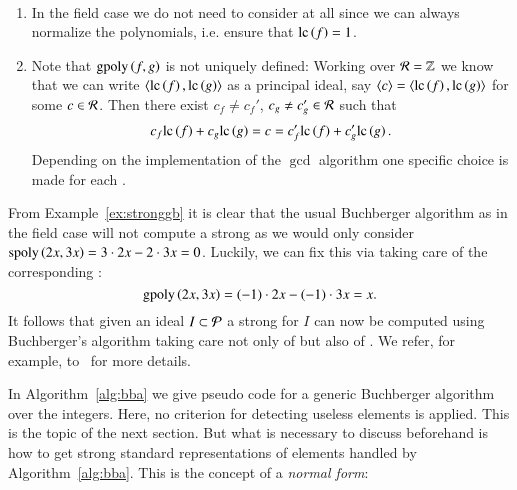 \begin{remark} \
\label{rem:gpairs}
\begin{enumerate}
\item In the field case we do not need to consider \gpts at all since we can
always normalize the polynomials, i.e. ensure that $\mathrm{lc}\left({f}\right) = 1$.
\item Note that $\mathrm{gpoly}\left({f},{g}\right)$ is not uniquely defined: Working over $\mathcal{R} = \mathbb{Z}$ we
know that we can write $\langle \mathrm{lc}\left({f}\right), \mathrm{lc}\left({g}\right) \rangle$ as a principal ideal, say
$\langle c \rangle = \langle \mathrm{lc}\left({f}\right), \mathrm{lc}\left({g}\right) \rangle$ for some $c\in\mathcal{R}$. Then
there exist $c_f \neq c_f'$, $c_g \neq c_g' \in \mathcal{R}$ such that
\[c_f \mathrm{lc}\left({f}\right) + c_g \mathrm{lc}\left({g}\right) = c = c_f' \mathrm{lc}\left({f}\right) + c_g' \mathrm{lc}\left({g}\right).\]
Depending on the implementation of the $\gcd$ algorithm one specific choice is
made for each \gpt.
\end{enumerate}
\end{remark}

From Example~\ref{ex:stronggb} it is clear that the usual Buchberger
algorithm as in the field case will not compute a strong \stb as we would only
consider $\mathrm{spoly}\left({2x},{3x}\right) = 3 \cdot 2x - 2 \cdot 3x = 0$. Luckily, we
can fix this via taking care of the corresponding \gpt:
\[\mathrm{gpoly}\left({2x},{3x}\right) = (-1) \cdot 2x - (-1) \cdot 3x = x.\]
It follows that given an ideal $I \subset \mathcal{P}$ a strong \stb for $I$ can now be computed using
Buchberger's algorithm taking care not only of \spts but also of \gpts. We refer,
for example,  to~\cite{lichtblau2012} for more details.

In Algorithm~\ref{alg:bba} we give pseudo code for a generic Buchberger
algorithm over the integers. Here, no criterion for detecting useless elements
is applied. This is the topic of the next section. But what is necessary to
discuss beforehand is how to get strong standard representations of elements
handled by Algorithm~\ref{alg:bba}. This is the concept of a \emph{normal
form}:

